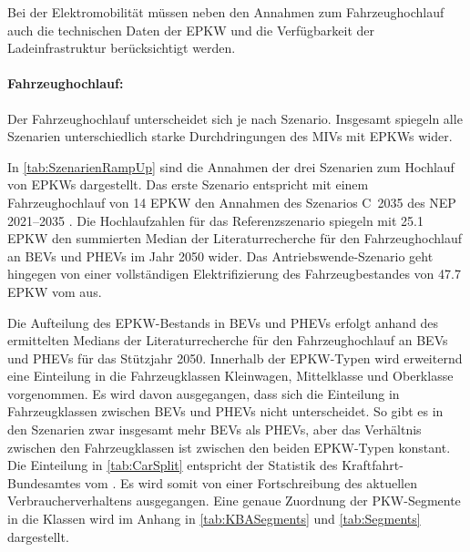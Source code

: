 Bei der Elektromobilität müssen neben den Annahmen zum Fahrzeughochlauf auch die technischen Daten der \gls{EPKW} und die Verfügbarkeit der Ladeinfrastruktur berücksichtigt werden.


\paragraph{Fahrzeughochlauf:}
Der Fahrzeughochlauf unterscheidet sich je nach Szenario.
Insgesamt spiegeln alle Szenarien unterschiedlich starke Durchdringungen des \glspl{MIV} mit \glspl{EPKW} wider.



In \autoref{tab:SzenarienRampUp} sind die Annahmen der drei Szenarien zum Hochlauf von \glspl{EPKW} dargestellt.
Das erste Szenario entspricht mit einem Fahrzeughochlauf von \SI{14}{\Mio} \gls{EPKW} den Annahmen des Szenarios C~\num{2035} des \gls{NEP} \numrange[range-phrase=~{--}~]{2021}{2035} \cite{BNetzA2020}.
Die Hochlaufzahlen für das Referenzszenario spiegeln mit \SI{25.1}{\Mio} \gls{EPKW} den summierten Median der Literaturrecherche für den Fahrzeughochlauf an \glspl{BEV} und \glspl{PHEV} im Jahr \num{2050} wider.
Das Antriebswende-Szenario geht hingegen von einer vollständigen Elektrifizierung des Fahrzeugbestandes von \SI{47.7}{\Mio} \gls{EPKW} vom  \cite{KBA2020} aus.



Die Aufteilung des \gls{EPKW}-Bestands in \glspl{BEV} und \glspl{PHEV} erfolgt anhand des ermittelten Medians der Literaturrecherche für den Fahrzeughochlauf an \glspl{BEV} und \glspl{PHEV} für das Stützjahr \num{2050}.
Innerhalb der \gls{EPKW}-Typen wird erweiternd eine Einteilung in die Fahrzeugklassen Kleinwagen, Mittelklasse und Oberklasse vorgenommen.
Es wird davon ausgegangen, dass sich die Einteilung in Fahrzeugklassen zwischen \glspl{BEV} und \glspl{PHEV} nicht unterscheidet.
So gibt es in den Szenarien zwar insgesamt mehr \glspl{BEV} als \glspl{PHEV}, aber das Verhältnis zwischen den Fahrzeugklassen ist zwischen den beiden \gls{EPKW}-Typen konstant.
Die Einteilung in \autoref{tab:CarSplit} entspricht der Statistik des Kraftfahrt-Bundesamtes \cite{KBASegments2020} vom .
Es wird somit von einer Fortschreibung des aktuellen Verbraucherverhaltens ausgegangen.
Eine genaue Zuordnung der \gls{PKW}-Segmente in die Klassen wird im Anhang in \autoref{tab:KBASegments} und \autoref{tab:Segments} dargestellt.


